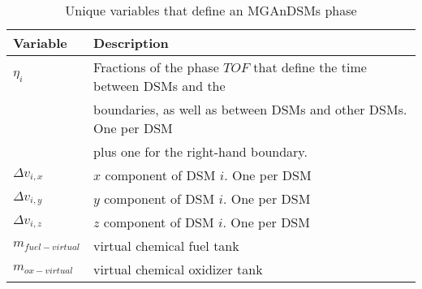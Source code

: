 \begin{table}
	\centering
	\caption{Unique variables that define an \ac{MGAnDSMs} phase}
	\label{tab:decision_variables_MGAnDSMs}
	\begin{tabular}{ll}
		\hline\hline
		Variable & Description\\
		\hline
		$\eta_i$ &Fractions of the phase $TOF$ that define the time between \ac{DSM}s and the\\
		& boundaries, as well as between \ac{DSM}s and other \ac{DSM}s. One per \ac{DSM}\\
		& plus one for the right-hand boundary.\\
		$\Delta v_{i,x}$ & $x$ component of \ac{DSM} $i$. One per \ac{DSM}\\
		$\Delta v_{i,y}$ & $y$ component of \ac{DSM} $i$. One per \ac{DSM}\\
		$\Delta v_{i,z}$ & $z$ component of \ac{DSM} $i$. One per \ac{DSM}\\
		$m_{fuel-virtual}$ & virtual chemical fuel tank\\
		$m_{ox-virtual}$ & virtual chemical oxidizer tank\\
		\hline\hline		
	\end{tabular}
\end{table}

